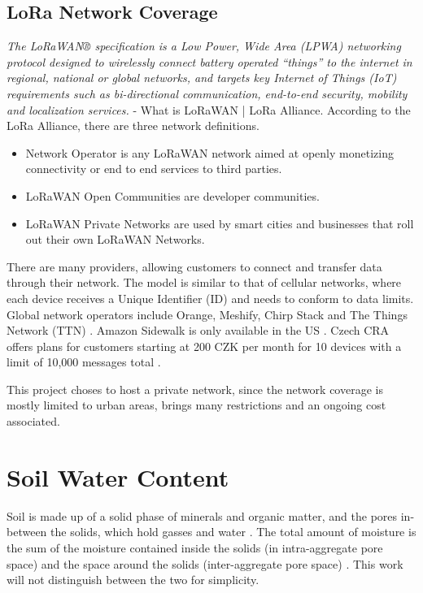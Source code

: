 \subsection{LoRa Network Coverage}
\emph{The LoRaWAN® specification is a Low Power, Wide Area (LPWA) networking protocol designed to wirelessly connect battery operated ``things'' to the internet in regional, national or global networks, and targets key Internet of Things (IoT) requirements such as bi-directional communication, end-to-end security, mobility and localization services.} - What is LoRaWAN | LoRa Alliance. According to the LoRa Alliance, there are three network definitions.
\begin{itemize}
    \item Network Operator is any LoRaWAN network aimed at openly monetizing connectivity or end to end services to third parties.
    \item LoRaWAN Open Communities are developer communities.
    \item LoRaWAN Private Networks are used by smart cities and businesses that roll out their own LoRaWAN Networks.
\end{itemize}

There are many providers, allowing customers to connect and transfer data through their network. The model is similar to that of cellular networks, where each device receives a Unique Identifier (ID) and needs to conform to data limits. Global network operators include Orange, Meshify, Chirp Stack and The Things Network (TTN) \cite{the_things_network_things_nodate}. Amazon Sidewalk is only available in the US \cite{amazon_inc_amazoncom_nodate}. Czech CRA offers plans for customers starting at 200 CZK per month for 10 devices with a limit of 10,000 messages total \cite{pixman_sro_objednavate_nodate}.

This project choses to host a private network, since the network coverage is mostly limited to urban areas, brings many restrictions \cite{the_things_network_eu863-870_nodate,the_things_network_message_nodate} and an ongoing cost associated.

\newpage
\section{Soil Water Content}
Soil is made up of a solid phase of minerals and organic matter, and the pores in-between the solids, which hold gasses and water \cite{paul_soil_2007}. The total amount of moisture is the sum of the moisture contained inside the solids (in intra-aggregate pore space) and the space around the solids (inter-aggregate pore space) \cite{myjove_corporation_determination_2024}. This work will not distinguish between the two for simplicity.

